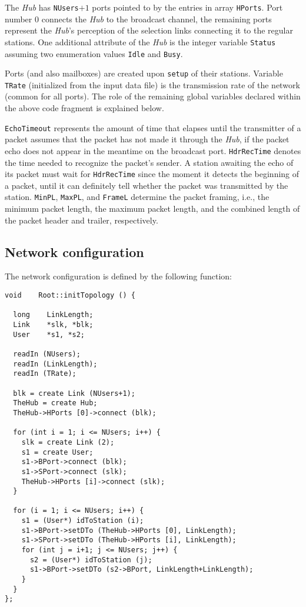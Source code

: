 The {\em Hub\/} has {\tt NUsers}$+1$ ports pointed to by the entries in
array {\tt HPorts}.
Port number $0$ connects the {\em Hub\/} to the broadcast channel, the
remaining ports represent the {\em Hub\/}'s perception of the selection
links connecting it to the regular stations.
One additional attribute of the {\em Hub\/} is the integer variable
{\tt Status} assuming two enumeration values {\tt Idle} and {\tt Busy}.

Ports (and also mailboxes) are created upon {\tt setup} of their stations.
Variable {\tt TRate} (initialized from the input data file) is the
transmission rate of the network (common for all ports).
The role of the remaining global variables declared within the above
code fragment is explained below.

{\tt EchoTimeout} represents the amount of time that elapses until the
transmitter of a packet assumes that the packet has not made it through the
{\em Hub}, if the packet echo does not appear in the meantime on the broadcast
port.
{\tt HdrRecTime} denotes the time needed to recognize the packet's sender.
A station awaiting the echo of its packet must wait for {\tt HdrRecTime}
since the moment it detects the beginning of a packet, until it can definitely
tell whether the packet was transmitted by the station.
{\tt MinPL}, {\tt MaxPL}, and {\tt FrameL} determine the packet framing, i.e.,
the minimum packet length, the maximum packet length, and the combined
length of the packet header and trailer, respectively.

\subsection{Network configuration}

The network configuration is defined by the following function:
{\small
\begin{verbatim}
void    Root::initTopology () {

  long    LinkLength;
  Link    *slk, *blk;
  User    *s1, *s2;

  readIn (NUsers);
  readIn (LinkLength);
  readIn (TRate);

  blk = create Link (NUsers+1);
  TheHub = create Hub;
  TheHub->HPorts [0]->connect (blk);

  for (int i = 1; i <= NUsers; i++) {
    slk = create Link (2);
    s1 = create User;
    s1->BPort->connect (blk);
    s1->SPort->connect (slk);
    TheHub->HPorts [i]->connect (slk);
  }

  for (i = 1; i <= NUsers; i++) {
    s1 = (User*) idToStation (i);
    s1->BPort->setDTo (TheHub->HPorts [0], LinkLength);
    s1->SPort->setDTo (TheHub->HPorts [i], LinkLength);
    for (int j = i+1; j <= NUsers; j++) {
      s2 = (User*) idToStation (j);
      s1->BPort->setDTo (s2->BPort, LinkLength+LinkLength);
    }
  }
};
\end{verbatim} }

